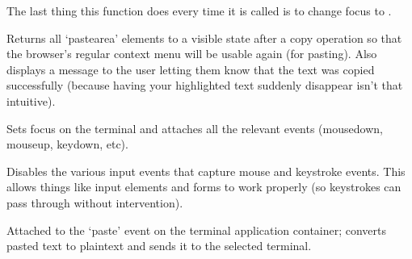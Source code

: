 \documentclass[letterpaper,10pt,openany]{sphinxmanual}
\begin{document}
\begin{fulllineitems}
\begin{fulllineitems}
The last thing this function does every time it is called is to change focus to .

\end{fulllineitems}



\begin{fulllineitems}
\label{Applications/terminal/js_terminal_input:GateOne.Terminal.Input.onCopy}
Returns all `pastearea' elements to a visible state after a copy operation so that the browser's regular context menu will be usable again (for pasting).  Also displays a message to the user letting them know that the text was copied successfully (because having your highlighted text suddenly disappear isn't that intuitive).

\end{fulllineitems}



\begin{fulllineitems}
\label{Applications/terminal/js_terminal_input:GateOne.Terminal.Input.capture}
Sets focus on the terminal and attaches all the relevant events (mousedown, mouseup, keydown, etc).

\end{fulllineitems}



\begin{fulllineitems}
\label{Applications/terminal/js_terminal_input:GateOne.Terminal.Input.disableCapture}
Disables the various input events that capture mouse and keystroke events.  This allows things like input elements and forms to work properly (so keystrokes can pass through without intervention).

\end{fulllineitems}



\begin{fulllineitems}
\label{Applications/terminal/js_terminal_input:GateOne.Terminal.Input.onPaste}
Attached to the `paste' event on the terminal application container; converts pasted text to plaintext and sends it to the selected terminal.


\end{fulllineitems}
\end{fulllineitems}
\end{document}
